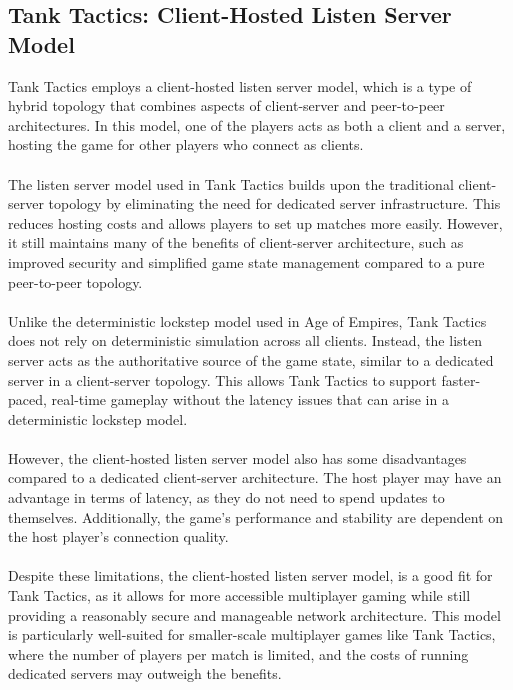 \subsection{Tank Tactics: Client-Hosted Listen Server Model}
Tank Tactics employs a client-hosted listen server model, which is a type of hybrid topology that combines aspects of client-server and peer-to-peer architectures. In this model, one of the players acts as both a client and a server, hosting the game for other players who connect as clients.
\\
\noindent
\\
The listen server model used in Tank Tactics builds upon the traditional client-server topology by eliminating the need for dedicated server infrastructure. This reduces hosting costs and allows players to set up matches more easily. However, it still maintains many of the benefits of client-server architecture, such as improved security and simplified game state management compared to a pure peer-to-peer topology.
\\
\noindent
\\
Unlike the deterministic lockstep model used in Age of Empires, Tank Tactics does not rely on deterministic simulation across all clients. Instead, the listen server acts as the authoritative source of the game state, similar to a dedicated server in a client-server topology. This allows Tank Tactics to support faster-paced, real-time gameplay without the latency issues that can arise in a deterministic lockstep model.
\\
\noindent
\\
However, the client-hosted listen server model also has some disadvantages compared to a dedicated client-server architecture. The host player may have an advantage in terms of latency, as they do not need to spend updates to themselves. Additionally, the game's performance and stability are dependent on the host player's connection quality.
\\
\noindent
\\
Despite these limitations, the client-hosted listen server model, is a good fit for Tank Tactics, as it allows for more accessible multiplayer gaming while still providing a reasonably secure and manageable network architecture. This model is particularly well-suited for smaller-scale multiplayer games like Tank Tactics, where the number of players per match is limited, and the costs of running dedicated servers may outweigh the benefits.

